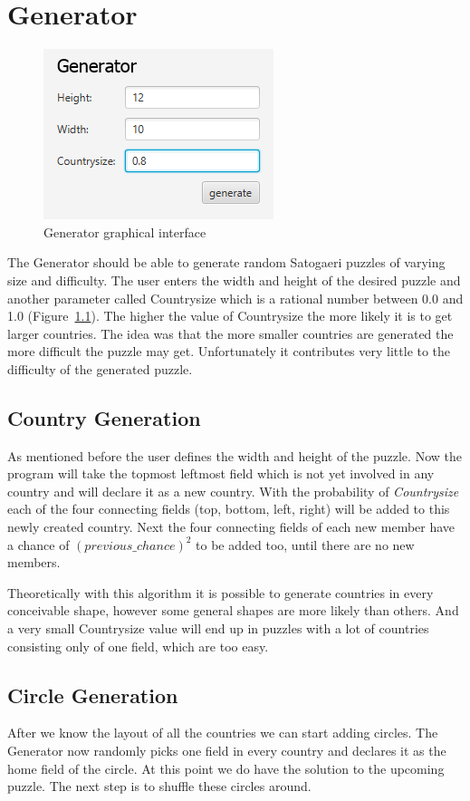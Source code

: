 \chapter{Generator} \label{The Generator}
\begin{figure}
  \centering
  \includegraphics[scale=1]{Pictures/generator.png} 
  \caption{Generator graphical interface}
  \label{fig:generator}
\end{figure}
The Generator should be able to generate random Satogaeri puzzles of varying size and difficulty. The user enters the width and height of the desired puzzle and another parameter called Countrysize which is a rational number between 0.0 and 1.0 (Figure~\ref{fig:generator}). The higher the value of Countrysize the more likely it is to get larger countries. The idea was that the more smaller countries are generated the more difficult the puzzle may get. Unfortunately it contributes very little to the difficulty of the generated puzzle.

\section{Country Generation}
As mentioned before the user defines the width and height of the puzzle. Now the program will take the topmost leftmost field which is not yet involved in any country and will declare it as a new country. With the probability of \emph{Countrysize} each of the four connecting fields (top, bottom, left, right) will be added to this newly created country. Next the four connecting fields of each new member have a chance of \emph{\((previous\_chance)^2\)} to be added too, until there are no new members.

Theoretically with this algorithm it is possible to generate countries in every conceivable shape, however some general shapes are more likely than others. And a very small Countrysize value will end up in puzzles with a lot of countries consisting only of one field, which are too easy.

\section{Circle Generation}
After we know the layout of all the countries we can start adding circles. The Generator now randomly picks one field in every country and declares it as the home field of the circle. At this point we do have the solution to the upcoming puzzle. The next step is to shuffle these circles around.

